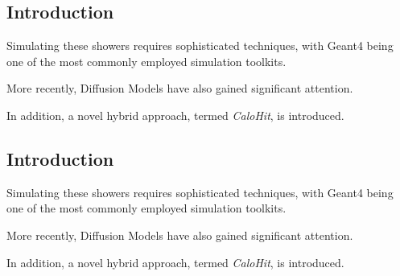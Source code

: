 \begin{frame}[t]
\chapter{Introduction}
\label{chap:introduction}


Simulating these showers requires sophisticated techniques, with Geant4 \parencite{geant_simul_toolkit} being one of the most commonly employed simulation toolkits.

More recently, Diffusion Models \parencite{Sohl-Dickstein:2015dhe} have also gained significant attention.

In addition, a novel hybrid approach, termed \emph{CaloHit}, is introduced.
\end{frame}

\begin{frame}[t]
\chapter{Introduction}
\label{chap:introduction}


Simulating these showers requires sophisticated techniques, with Geant4 \parencite{geant_simul_toolkit} being one of the most commonly employed simulation toolkits.

More recently, Diffusion Models \parencite{Sohl-Dickstein:2015dhe} have also gained significant attention.

In addition, a novel hybrid approach, termed \emph{CaloHit}, is introduced.
\end{frame}

